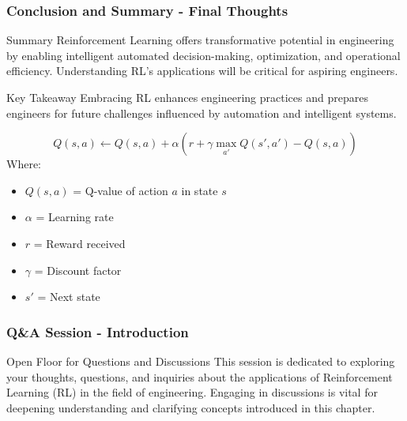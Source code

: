 \documentclass[aspectratio=169]{beamer}
\begin{document}
\begin{frame}[fragile]
    \frametitle{Conclusion and Summary - Final Thoughts}
    \begin{block}{Summary}
        Reinforcement Learning offers transformative potential in engineering by enabling intelligent automated decision-making, optimization, and operational efficiency. Understanding RL's applications will be critical for aspiring engineers.
    \end{block}

    \begin{block}{Key Takeaway}
        Embracing RL enhances engineering practices and prepares engineers for future challenges influenced by automation and intelligent systems.
    \end{block}

    \begin{equation}
        Q(s, a) \leftarrow Q(s, a) + \alpha \left( r + \gamma \max_{a'} Q(s', a') - Q(s, a) \right)
    \end{equation}
    Where:
    \begin{itemize}
        \item \( Q(s, a) \) = Q-value of action \( a \) in state \( s \)
        \item \( \alpha \) = Learning rate
        \item \( r \) = Reward received
        \item \( \gamma \) = Discount factor
        \item \( s' \) = Next state
    \end{itemize}
\end{frame}

\begin{frame}[fragile]
    \frametitle{Q\&A Session - Introduction}
    \begin{block}{Open Floor for Questions and Discussions}
        This session is dedicated to exploring your thoughts, questions, 
        and inquiries about the applications of Reinforcement Learning (RL) 
        in the field of engineering. Engaging in discussions is vital for 
        deepening understanding and clarifying concepts introduced in this chapter.
    \end{block}
\end{frame}
\end{document}

